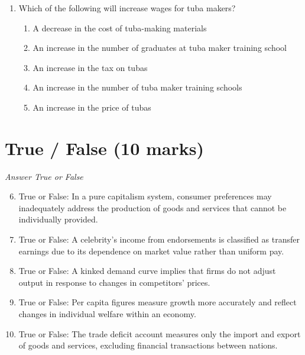\documentclass[12pt]{article}
\begin{document}
\begin{enumerate}[label=\arabic*.]
\begin{enumerate}[label=(\alph*)]
    \item Rich and poor countries will experience the same growth rates regardless of savings rates
    \item Poor countries will have fluctuating growth rates independent of savings
    \item The level of technology determines growth rates, not savings
    \item The level of income has no impact on savings
    \item Savings have no correlation with growth rates in any country
\end{enumerate}
\item Which of the following will increase wages for tuba makers?
\begin{enumerate}[label=(\alph*)]
    \item A decrease in the cost of tuba-making materials
    \item An increase in the number of graduates at tuba maker training school
    \item An increase in the tax on tubas
    \item An increase in the number of tuba maker training schools
    \item An increase in the price of tubas
\end{enumerate}
\end{enumerate}

\section*{True / False (10 marks)}
\textit{Answer True or False}
\begin{enumerate}[label=\arabic*.]
\setcounter{enumi}{5}
\item True or False: In a pure capitalism system, consumer preferences may inadequately address the production of goods and services that cannot be individually provided.
\item True or False: A celebrity's income from endorsements is classified as transfer earnings due to its dependence on market value rather than uniform pay.
\item True or False: A kinked demand curve implies that firms do not adjust output in response to changes in competitors' prices.
\item True or False: Per capita figures measure growth more accurately and reflect changes in individual welfare within an economy.
\item True or False: The trade deficit account measures only the import and export of goods and services, excluding financial transactions between nations.
\end{enumerate}
\end{document}
